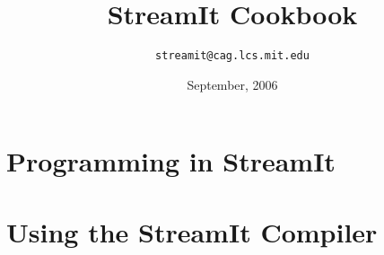 \documentclass[11pt]{article}
\title{StreamIt Cookbook}
\author{\texttt{streamit@cag.lcs.mit.edu}}
\date{September, 2006}
\begin{document}
\maketitle



\section{Programming in StreamIt}








\bigskip \section{Using the StreamIt Compiler}
\label{sec:compiler}


\appendix



\end{document}
